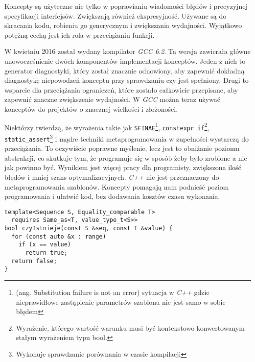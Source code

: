\documentclass[11pt, a4paper]{article}
\begin{document}
\lstset{language=C++}


Koncepty są użyteczne nie tylko w poprawianiu wiadomości błędów i precyzyjnej specyfikacji interfejsów. Zwiększają również ekspresyjność. Używane są do skracania kodu, robieniu go generycznym i zwiększania wydajności. Wyjątkowo potężną cechą jest ich rola w przeciążaniu funkcji. 

W kwietniu 2016 został wydany kompilator \emph{GCC 6.2}. Ta wersja zawierała główne unowocześnienie dwóch komponentów implementacji konceptów. Jeden z nich to generator diagnostyki, który został znacznie odnowiony, aby zapewnić dokładną diagnostykę niepowodzeń konceptu przy sprawdzaniu czy jest spełniony. Drugi to wsparcie dla przeciążania ograniczeń, które zostało całkowicie przepisane, aby zapewnić znaczne zwiększenie wydajności. W \emph{GCC} można teraz używać konceptów do projektów o znacznej wielkości i złożoności.

Niektórzy twierdzą, że wyrażenia takie jak \verb#SFINAE#\footnote{(ang. Substitution failure is not an error) sytuacja w \emph{C++} gdzie nieprawidłowe zastąpienie parametrów szablonu nie jest samo w sobie błędem}, \verb#constexpr if#\footnote{Wyrażenie, którego wartość warunku musi być kontekstowo konwertowanym stałym wyrażeniem typu bool.}, \newline \verb#static_assert#\footnote{Wykonuje sprawdzanie porównania w czasie kompilacji} i mądre techniki metaprogramowania w zupełności wystarczą do przeciążania. To oczywiście poprawne myślenie, lecz jest to obniżanie poziomu abstrakcji, co skutkuje tym, że programuje się w sposób żeby było zrobione a nie jak powinno być. Wynikiem jest więcej pracy dla programisty, zwiększona ilość błędów i mniej szans optymalizacyjnych. \emph{C++} nie jest przeznaczony do metaprogramowania szablonów. Koncepty pomagają nam podnieść poziom programowania i ułatwić kod, bez dodawania kosztów czasu wykonania. \newline

\begin{lstlisting}[frame=single]
template<Sequence S, Equality_comparable T>
  requires Same_as<T, value_type_t<S>>
bool czyIstnieje(const S &seq, const T &value) {
  for (const auto &x : range)
    if (x == value)
      return true;
  return false;
}
\end{lstlisting}
\end{document}
